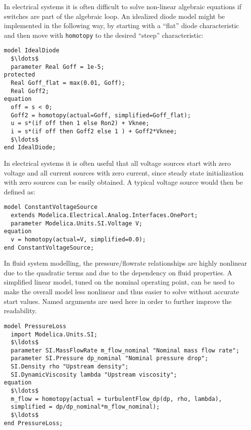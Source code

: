 \begin{example}[1] In electrical systems it is often difficult to solve non-linear
algebraic equations if switches are part of the algebraic loop. An
idealized diode model might be implemented in the following way, by
starting with a ``flat'' diode characteristic and then move with
\lstinline!homotopy! to the desired ``steep'' characteristic:
\begin{lstlisting}[language=modelica]
model IdealDiode
  $\ldots$
  parameter Real Goff = 1e-5;
protected
  Real Goff_flat = max(0.01, Goff);
  Real Goff2;
equation
  off = s < 0;
  Goff2 = homotopy(actual=Goff, simplified=Goff_flat);
  u = s*(if off then 1 else Ron2) + Vknee;
  i = s*(if off then Goff2 else 1 ) + Goff2*Vknee;
  $\ldots$
end IdealDiode;
\end{lstlisting}
\end{example}

\begin{example}[2] In electrical systems it is often useful that all voltage sources
start with zero voltage and all current sources with zero current, since
steady state initialization with zero sources can be easily obtained. A
typical voltage source would then be defined as:
\begin{lstlisting}[language=modelica]
model ConstantVoltageSource
  extends Modelica.Electrical.Analog.Interfaces.OnePort;
  parameter Modelica.Units.SI.Voltage V;
equation
  v = homotopy(actual=V, simplified=0.0);
end ConstantVoltageSource;
\end{lstlisting}
\end{example}

\begin{example}[3] In fluid system modelling, the pressure/flowrate relationships are
highly nonlinear due to the quadratic terms and due to the dependency on
fluid properties. A simplified linear model, tuned on the nominal
operating point, can be used to make the overall model less nonlinear
and thus easier to solve without accurate start values. Named arguments
are used here in order to further improve the readability.
\begin{lstlisting}[language=modelica]
model PressureLoss
  import Modelica.Units.SI;
  $\ldots$
  parameter SI.MassFlowRate m_flow_nominal "Nominal mass flow rate";
  parameter SI.Pressure dp_nominal "Nominal pressure drop";
  SI.Density rho "Upstream density";
  SI.DynamicViscosity lambda "Upstream viscosity";
equation
  $\ldots$
  m_flow = homotopy(actual = turbulentFlow_dp(dp, rho, lambda),
  simplified = dp/dp_nominal*m_flow_nominal);
  $\ldots$
end PressureLoss;
\end{lstlisting}
\end{example}

